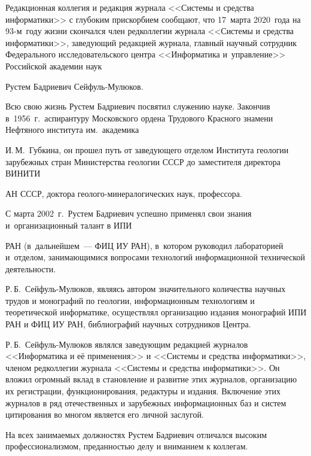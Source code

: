       Редакционная коллегия и редакция журнала <<Системы и средства информатики>> с глубоким прискорбием сообщают, что 17~марта 2020~года на 93-м~году жизни скончался член редколлегии журнала <<Системы и средства информатики>>, заведующий редакцией журнала, главный научный сотрудник Федерального исследовательского центра <<Информатика и~управление>> Российской академии наук


      Рустем Бадриевич Сейфуль-Мулюков.


           


     Всю свою жизнь Рустем Бадриевич посвятил служению науке. Закончив в~1956~г.\ аспирантуру Московского ордена Трудового Красного знамени Нефтяного института им.\ академика


     И.\,М.~Губкина, он прошел путь от заведующего отделом Института геологии зарубежных стран Министерства геологии СССР до заместителя директора ВИНИТИ


     АН СССР, доктора гео\-ло\-го-ми\-не\-ра\-ло\-ги\-че\-ских наук, профессора.


     


     С марта 2002~г.\ Рустем Бадриевич успешно применял свои знания и~организационный талант в ИПИ


     РАН (в~дальнейшем~--- ФИЦ ИУ РАН), в~котором руководил лабораторией и~отделом, занимающимися вопросами технологий информационной технической деятельности. 


Р.\,Б.~Сейфуль-Мулюков, являясь автором значительного количества научных трудов и монографий по геологии, информационным технологиям и теоретической информатике, осуществлял организацию издания монографий ИПИ РАН и ФИЦ ИУ РАН, библиографий научных сотрудников Центра.


     


     Р.\,Б.~Сейфуль-Мулюков являлся заведующим редакцией журналов <<Информатика и её применения>> и <<Системы и средства информатики>>, членом редколлегии журнала <<Системы и средства информатики>>. Он вложил огромный вклад в становление и развитие этих журналов, организацию их регистрации, функционирования, редактуры и издания. Включение этих журналов в ряд отечественных и зарубежных информационных баз и систем цитирования во многом является его личной заслугой.


     


     На всех занимаемых должностях Рустем Бадриевич отличался высоким профессионализмом, преданностью делу и вниманием к коллегам.


